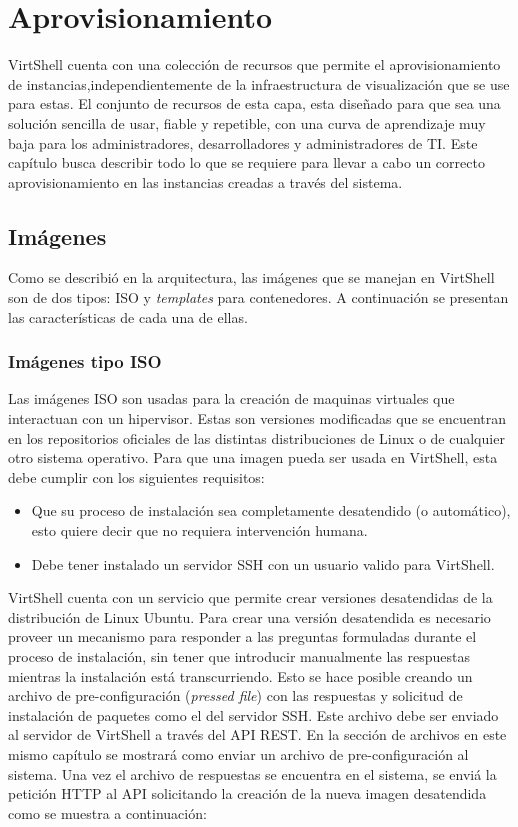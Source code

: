 \chapter{Aprovisionamiento}
\label{capaprovisionamiento}

VirtShell cuenta con una colección de recursos que permite el aprovisionamiento de instancias,independientemente de la infraestructura de visualización que se use para estas. El conjunto de recursos de esta capa, esta diseñado para que sea una solución sencilla de usar, fiable y repetible, con una curva de aprendizaje muy baja para los administradores, desarrolladores y administradores de TI. Este capítulo busca describir todo lo que se requiere para llevar a cabo un correcto aprovisionamiento en las instancias creadas a través del sistema.

\section{Imágenes}
Como se describió en la arquitectura, las imágenes que se manejan en VirtShell son de dos tipos: ISO y \emph{templates} para contenedores. A continuación se presentan las características de cada una de ellas.

\subsection{Imágenes tipo ISO}
Las imágenes ISO son usadas para la creación de maquinas virtuales que interactuan con un hipervisor. Estas son versiones modificadas que se encuentran en los repositorios oficiales de las distintas distribuciones de Linux o de cualquier otro sistema operativo. Para que una imagen pueda ser usada en VirtShell, esta debe cumplir con los siguientes requisitos: 
\begin{itemize}
\item Que su proceso de instalación sea completamente desatendido (o automático), esto quiere decir que no requiera intervención humana.
\item Debe tener instalado un servidor SSH con un usuario valido para VirtShell.
\end{itemize}

VirtShell cuenta con un servicio que permite crear versiones desatendidas de la distribución de Linux Ubuntu. Para crear una versión desatendida es necesario proveer un mecanismo para responder a las preguntas formuladas durante el proceso de instalación, sin tener que introducir manualmente las respuestas mientras la instalación está transcurriendo. Esto se hace posible creando un archivo de pre-configuración (\emph{pressed file}) con las respuestas y solicitud de instalación de paquetes como el del servidor SSH. Este archivo debe ser enviado al servidor de VirtShell a través del API REST. En la sección de archivos en este mismo capítulo se mostrará como enviar un archivo de pre-configuración al sistema. Una vez el archivo de respuestas se encuentra en el sistema, se enviá la petición HTTP al API solicitando la creación de la nueva imagen desatendida como se muestra a continuación:

